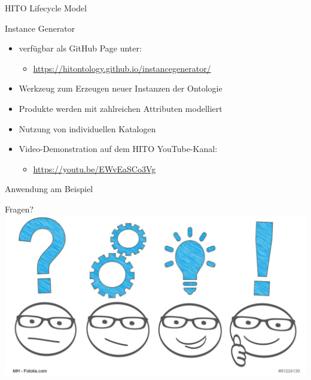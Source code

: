 \documentclass[aspectratio=1610,12pt]{beamer}
\begin{document}
\begin{frame}{HITO Lifecycle Model}
 \centering
  \vspace{-0.5cm}
\end{frame}

\begin{frame}{Instance Generator}
\begin{spacing}{1.25}
\begin{itemize}
\item verfügbar als GitHub Page unter:
\begin{itemize}
\item \url{https://hitontology.github.io/instancegenerator/}
\end{itemize}
\item Werkzeug zum Erzeugen neuer Instanzen der Ontologie
\item Produkte werden mit zahlreichen Attributen modelliert
\item Nutzung von individuellen Katalogen
\item Video-Demonstration auf dem HITO YouTube-Kanal:
\begin{itemize}
\item \url{https://youtu.be/EWvEaSCo3Vg}
\end{itemize}
\end{itemize}
\end{spacing}
\end{frame}

\begin{frame}{Anwendung am Beispiel}
\end{frame}

\begin{frame}{Fragen?}
  \centering
  \vspace{-0.5cm}
  \includegraphics[width=\textwidth]{img/fragen.png}
\end{frame}
\end{document}
